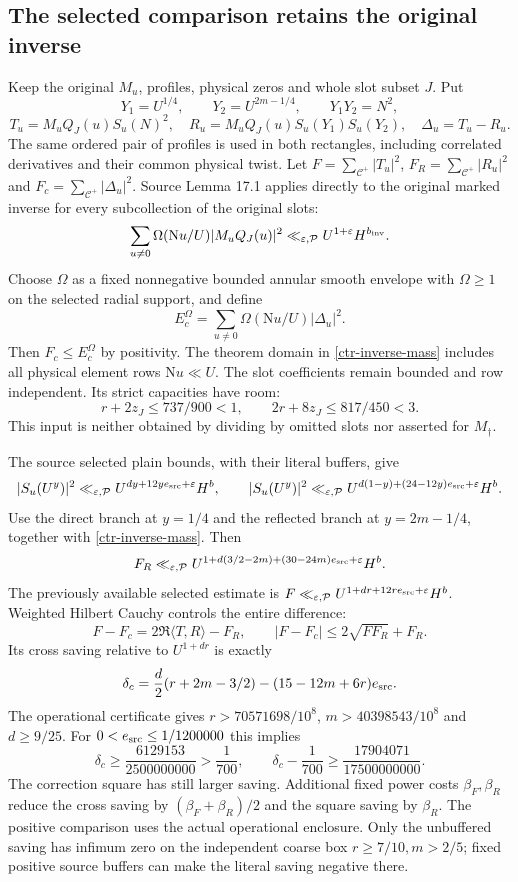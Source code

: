 \documentclass[11pt]{article}
\theoremstyle{definition}
\newcommand{\N}{\mathrm N}
\newcommand{\eps}{\varepsilon}
\newcommand{\Cplus}{\mathcal C^+}
\newcommand{\lls}{\ll_{\eps,\mathcal P}}
\begin{document}
\subsection{The selected comparison retains the original inverse}
Keep the original $M_u$, profiles, physical zeros and whole slot subset
$J$. Put
\[
 Y_1=U^{1/4},\qquad Y_2=U^{2m-1/4},\qquad Y_1Y_2=N^2,
\]
\[
 T_u=M_uQ_J(u)S_u(N)^2,\quad
 R_u=M_uQ_J(u)S_u(Y_1)S_u(Y_2),\quad
 \Delta_u=T_u-R_u .
\]
The same ordered pair of profiles is used in both rectangles, including
correlated derivatives and their common physical twist.
Let $F=\sum_{\Cplus}|T_u|^2$, $F_R=\sum_{\Cplus}|R_u|^2$ and
$F_c=\sum_{\Cplus}|\Delta_u|^2$. Source Lemma 17.1
\cite[printed p.~115]{source-primary} applies directly to the original
marked inverse for every subcollection of the original slots:
\begin{equation}\label{ctr-inverse-mass}
 \sum_{u\ne0}\Omega(\N u/U)|M_uQ_J(u)|^2
 \lls U^{1+\eps}H^{b_{\rm inv}}.
\end{equation}
Choose $\Omega$ as a fixed nonnegative bounded annular smooth envelope
with $\Omega\ge1$ on the selected radial support, and define
\[
 E_c^\Omega=\sum_{u\ne0}\Omega(\N u/U)|\Delta_u|^2.
\]
Then $F_c\le E_c^\Omega$ by positivity. The theorem domain in
\eqref{ctr-inverse-mass} includes all physical element rows $\N u\ll U$.
The slot coefficients remain bounded and row independent. Its strict
capacities have room:
\[
 r+2z_J\le737/900<1,\qquad 2r+8z_J\le817/450<3.
\]
This input is neither obtained by dividing by omitted slots nor
asserted for $M_\dagger$.

The source selected plain bounds, with their literal buffers, give
\[
 |S_u(U^y)|^2\lls U^{dy+12ye_{\rm src}+\eps}H^b,\qquad
 |S_u(U^y)|^2\lls
 U^{d(1-y)+(24-12y)e_{\rm src}+\eps}H^b.
\]
Use the direct branch at $y=1/4$ and the reflected branch at
$y=2m-1/4$, together with \eqref{ctr-inverse-mass}. Then
\[
 F_R\lls U^{1+d(3/2-2m)+(30-24m)e_{\rm src}+\eps}H^b.
\]
The previously available selected estimate is
$F\lls U^{1+dr+12re_{\rm src}+\eps}H^b$. Weighted Hilbert Cauchy
controls the entire difference:
\[
 F-F_c=2\Re\langle T,R\rangle-F_R,\qquad
 |F-F_c|\le2\sqrt{FF_R}+F_R.
\]
Its cross saving relative to $U^{1+dr}$ is exactly
\begin{equation}\label{ctr-comparison-saving}
 \delta_c=\frac d2(r+2m-3/2)
                -(15-12m+6r)e_{\rm src}.
\end{equation}
The operational certificate gives
$r>70571698/10^8$, $m>40398543/10^8$ and $d\ge9/25$.
For $0<e_{\rm src}\le1/1200000$ this implies
\[
 \delta_c\ge\frac{6129153}{2500000000}>\frac1{700},\qquad
 \delta_c-\frac1{700}\ge
 \frac{17904071}{17500000000}.
\]
The correction square has still larger saving. Additional fixed power
costs $\beta_F,\beta_R$ reduce the cross saving by
$(\beta_F+\beta_R)/2$ and the square saving by $\beta_R$.
The positive comparison uses the actual operational enclosure. Only
the unbuffered saving has infimum zero on the independent coarse box
$r\ge7/10,m>2/5$; fixed positive source buffers can make the literal
saving negative there.
\end{document}
